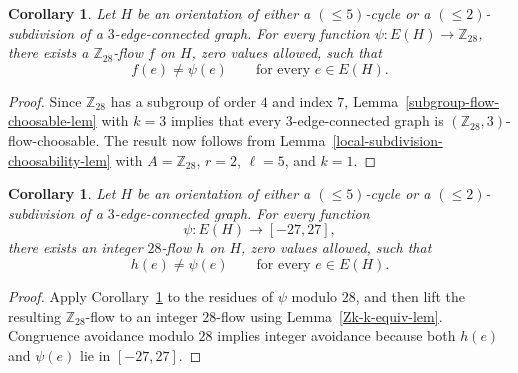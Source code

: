 \documentclass[a4paper,12pt]{article}
\theoremstyle{plain}
\newtheorem{cor}[theorem]{Corollary}
\theoremstyle{definition}
\newcommand{\Z}{\mathbb{Z}}
\renewcommand\le\leqslant
\begin{document}
\begin{cor}
    \label{local-Z28-cor}
    Let $H$ be an orientation of either a $(\le 5)$-cycle or a $(\le 2)$-subdivision of a $3$-edge-connected graph.  For every function $\psi:E(H)\to\Z_{28}$, there exists a $\Z_{28}$-flow $f$ on $H$, zero values allowed, such that
    \[
        f(e)\ne \psi(e)
        \qquad\text{for every }e\in E(H).
    \]
\end{cor}
\begin{proof}
    Since $\Z_{28}$ has a subgroup of order $4$ and index $7$, Lemma~\ref{subgroup-flow-choosable-lem} with $k=3$ implies that every $3$-edge-connected graph is $(\Z_{28},3)$-flow-choosable.  The result now follows from Lemma~\ref{local-subdivision-choosability-lem} with $A=\Z_{28}$, $r=2$, $\ell=5$, and $k=1$.
\end{proof}

\begin{cor}
    \label{local-28-flow-patch-cor}
    Let $H$ be an orientation of either a $(\le 5)$-cycle or a $(\le 2)$-subdivision of a $3$-edge-connected graph.  For every function
    \[
        \psi:E(H)\to[-27,27],
    \]
    there exists an integer $28$-flow $h$ on $H$, zero values allowed, such that
    \[
        h(e)\ne \psi(e)
        \qquad\text{for every }e\in E(H).
    \]
\end{cor}
\begin{proof}
    Apply Corollary~\ref{local-Z28-cor} to the residues of $\psi$ modulo $28$, and then lift the resulting $\Z_{28}$-flow to an integer $28$-flow using Lemma~\ref{Zk-k-equiv-lem}.  Congruence avoidance modulo $28$ implies integer avoidance because both $h(e)$ and $\psi(e)$ lie in $[-27,27]$.
\end{proof}
\end{document}

